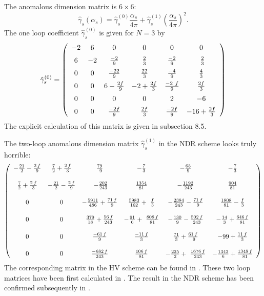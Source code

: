 \documentclass[12pt,rotate]{article}
\newcommand{\svs}{\vbox{\vskip 5mm}}
\newcommand{\mvs}{\vbox{\vskip 8mm}}
\def\as{\alpha_s}
\def\aspi{\frac{\as}{4\pi}}
\begin{document}
\begin{itemize}
\begin{itemize}
The anomalous dimension matrix is $6\times6$:
\begin{equation}
\hat\gamma_s(\as)=\hat\gamma_s^{(0)}\aspi + 
\hat\gamma_s^{(1)}\left(\aspi\right)^2.
\label{eq:gsexpKpp}
\end{equation}
The one loop coefficient $\hat \gamma_s^{(0)}$ is given for $N=3$  by
\cite{PENGUIN}
\begin{equation}
\hat \gamma^{(0)}_s = 
\left(
\begin{array}{cccccc}
{{-2}} & 6 & 0 & 0 & 0 & 0 \\ \svs
6 & {{-2}} & {{-2}\over {9}} & {2\over 3} & {{-2}\over {9}} &\
  {2\over 3} \\ \svs
0 & 0 & {{-22}\over {9}} & {{22}\over 3} & {{-4}\over {9}} & {4\over 3}
\\ \svs
0 & 0 & 6 - {{2 f}\over {9}} & {{-2}} + {{2 f}\over 3} & {{-2\
  f}\over {9}} & {{2 f}\over 3} \\ \svs
0 & 0 & 0 & 0 & {2} & -6  \\ \svs
0 & 0 & {{-2 f}\over {9}} & {{2 f}\over 3} & {{-2 f}\over {9}} & -16
   + {{2 f}\over 3}
\end{array}
\right)
\label{eq:gs0Kpp}
\end{equation}
The explicit calculation of this matrix is given in subsection 8.5.

The two-loop anomalous dimension matrix $\hat \gamma^{(1)}_s$ in the
NDR scheme looks truly  horrible:
\begin{equation}
\left(
\begin{array}{cccccc}
-{{21}\over 2} - {{2\,f}\over 9} & {7\over 2} + {{2\,f}\over 3} & {{79}\over\
  9} & -{7\over 3} & -{{65}\over 9} & -{{7}\over{3}} \\ \mvs
{7\over 2} + {{2\,f}\over 3} & -{{21}\over 2} - {{2\,f}\over 9} &\
  -{{202}\over {243}} & {{1354}\over {81}} & -{{1192}\over {243}} &
{904 \over 81} \\ \mvs
0 & 0 & -{{5911}\over {486}} + {{71\,f}\over 9} & {{5983}\over {162}} +\
  {f\over 3} & -{{2384}\over {243}} - {{71\,f}\over 9} &
{1808 \over 81} - {f \over 3} \\ \mvs
0 & 0 & {{379}\over {18}} + {{56\,f}\over {243}} & -{{91}\over 6} +\
  {{808\,f}\over {81}} & -{{130}\over 9} - {{502\,f}\over {243}} &
-{14 \over 3} + {{646\,f} \over 81} \\ \mvs
0 & 0 & {{-61\,f}\over 9} & {{-11\,f}\over 3} & {{71}\over 3} + {{61\,f}\over\
  9} & -99 + {{11\,f} \over 3} \\ \mvs
0 & 0 & {{-682\,f}\over {243}} & {{106\,f}\over {81}} & -{{225}\over 2} +\
  {{1676\,f}\over {243}} & -{1343 \over 6} + {{1348\,f} \over 81}
\end{array}
\right)
\label{eq:gs1ndrN3Kpp}
\end{equation}
The corresponding matrix in the HV scheme can be found in \cite{BJLW1}.
These two loop matrices have been first calculated in
\cite{BJLW1,ROMA1,ROMA2}. The result in the NDR scheme has been confirmed
subsequently in \cite{CZMM}.


\end{itemize}
\end{itemize}
\end{document}
